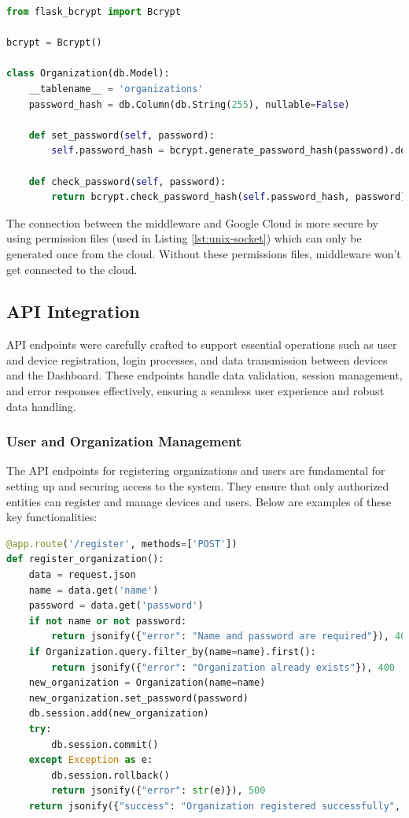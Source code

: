 \begin{lstlisting}[language=python, caption={Secure Password Handling in Organization Model}]
from flask_bcrypt import Bcrypt

bcrypt = Bcrypt()

class Organization(db.Model):
    __tablename__ = 'organizations'
    password_hash = db.Column(db.String(255), nullable=False)

    def set_password(self, password):
        self.password_hash = bcrypt.generate_password_hash(password).decode('utf-8')

    def check_password(self, password):
        return bcrypt.check_password_hash(self.password_hash, password)
\end{lstlisting}

The connection between the middleware and Google Cloud is more secure by using permission files (used in Listing \ref{lst:unix-socket}) which can only be generated once from the cloud. Without these permissions files, middleware won't get connected to the cloud.

\subsection{API Integration}

API endpoints were carefully crafted to support essential operations such as user and device registration, login processes, and data transmission between devices and the Dashboard. These endpoints handle data validation, session management, and error responses effectively, ensuring a seamless user experience and robust data handling.

\subsubsection{User and Organization Management}

The API endpoints for registering organizations and users are fundamental for setting up and securing access to the system. They ensure that only authorized entities can register and manage devices and users. Below are examples of these key functionalities:

\begin{lstlisting}[language=python, caption={API Endpoint for Organization Registration}]
@app.route('/register', methods=['POST'])
def register_organization():
    data = request.json
    name = data.get('name')
    password = data.get('password')
    if not name or not password:
        return jsonify({"error": "Name and password are required"}), 400
    if Organization.query.filter_by(name=name).first():
        return jsonify({"error": "Organization already exists"}), 400
    new_organization = Organization(name=name)
    new_organization.set_password(password)
    db.session.add(new_organization)
    try:
        db.session.commit()
    except Exception as e:
        db.session.rollback()
        return jsonify({"error": str(e)}), 500
    return jsonify({"success": "Organization registered successfully", "organization_id": new_organization.id, "organization_name": name}), 201
\end{lstlisting}

